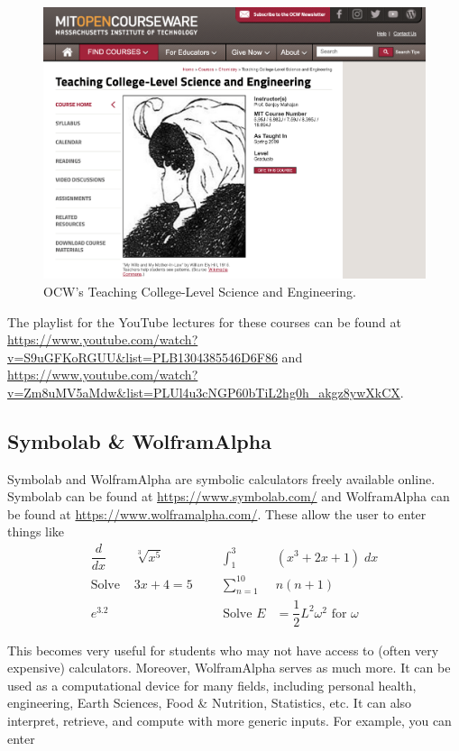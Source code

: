 	\begin{figure}[!ht]
	\centering
	\includegraphics[width=\textwidth]{sections/other/images/teaching.png}
	\caption{OCW's Teaching College-Level Science and Engineering.}
	\end{figure}

The playlist for the YouTube lectures for these courses can be found at \url{https://www.youtube.com/watch?v=S9uGFKoRGUU&list=PLB1304385546D6F86} and \url{https://www.youtube.com/watch?v=Zm8uMV5aMdw&list=PLUl4u3cNGP60bTiL2hg0h_akgz8ywXkCX}. 



\subsection{Symbolab \& WolframAlpha}

Symbolab and WolframAlpha are symbolic calculators freely available online. Symbolab can be found at \url{https://www.symbolab.com/} and WolframAlpha can be found at \url{https://www.wolframalpha.com/}. These allow the user to enter things like
	\[
	\begin{aligned}
	\dfrac{d}{dx}& \sqrt[3]{x^5} &&& \int_1^3 &(x^3+2x+1) \;dx \\
	\text{Solve } &3x+4= 5 &&& \sum_{n=1}^{10} &n(n+1) \\
	e^{3.2}& &&& \text{Solve } E&= \dfrac{1}{2} L^2 \omega^2 \text{ for } \omega
	\end{aligned}
	\]

This becomes very useful for students who may not have access to (often very expensive) calculators. Moreover, WolframAlpha serves as much more. It can be used as a computational device for many fields, including personal health, engineering, Earth Sciences, Food \& Nutrition, Statistics, etc. It can also interpret, retrieve, and compute with more generic inputs. For example, you can enter
	

